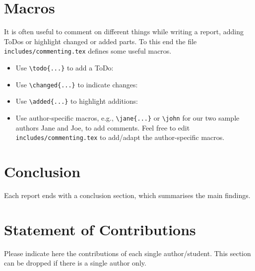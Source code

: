 \documentclass[review]{AIM_report}
\begin{document}
\section{Macros}

It is often useful to comment on different things while writing a report, adding ToDos or highlight changed or added parts. To this end the file \texttt{includes/commenting.tex} defines some useful macros.
\begin{itemize}
    \item Use \verb|\todo{...}| to add a ToDo:\newline {}
    \item Use \verb|\changed{...}| to indicate changes:\newline {}
    \item Use \verb|\added{...}| to highlight additions:\newline {}
    \item Use author-specific macros, e.g., \verb|\jane{...}| or \verb|\john| for our two sample authors Jane and Joe, to add comments. Feel free to edit \texttt{includes/commenting.tex} to add/adapt the author-specific macros.\newline{}
    \newline
\end{itemize}

\section{Conclusion}

Each report ends with a conclusion section, which summarises the main findings. 

\section*{Statement of Contributions}

Please indicate here the contributions of each single author/student. This section can be dropped if there is a single author only.

\printbibliography

\newpage
\pagestyle{empty}


\end{document}
